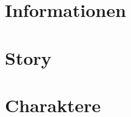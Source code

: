 \documentclass{./include/pnp}
\begin{document}
	\FrontMatter

	

	\TableOfContents

	\MainMatter

	\chapter{Informationen}
	
	\newpage
	

	\newpage
	\chapter{Story}
	

	\newpage
	\chapter{Charaktere}
	
\end{document}

